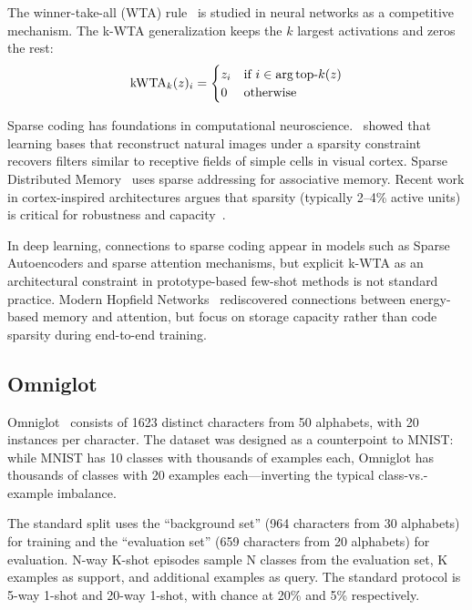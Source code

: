 \documentclass[11pt]{article}
\begin{document}
The winner-take-all (WTA) rule~\citep{maass2000computational} is studied in neural networks as a competitive mechanism. The k-WTA generalization keeps the $k$ largest activations and zeros the rest:
\begin{equation}
\text{kWTA}_k(z)_i = \begin{cases} z_i & \text{if } i \in \text{arg\,top-}k(z) \\ 0 & \text{otherwise} \end{cases}
\end{equation}

Sparse coding has foundations in computational neuroscience.~\citet{olshausen1996emergence} showed that learning bases that reconstruct natural images under a sparsity constraint recovers filters similar to receptive fields of simple cells in visual cortex. Sparse Distributed Memory~\citep{kanerva1988sparse} uses sparse addressing for associative memory. Recent work in cortex-inspired architectures argues that sparsity (typically 2--4\% active units) is critical for robustness and capacity~\citep{ahmad2019dense}.

In deep learning, connections to sparse coding appear in models such as Sparse Autoencoders and sparse attention mechanisms, but explicit k-WTA as an architectural constraint in prototype-based few-shot methods is not standard practice. Modern Hopfield Networks~\citep{ramsauer2021hopfield} rediscovered connections between energy-based memory and attention, but focus on storage capacity rather than code sparsity during end-to-end training.

\subsection{Omniglot}

Omniglot~\citep{lake2015human} consists of 1623 distinct characters from 50 alphabets, with 20 instances per character. The dataset was designed as a counterpoint to MNIST: while MNIST has 10 classes with thousands of examples each, Omniglot has thousands of classes with 20 examples each---inverting the typical class-vs.-example imbalance.

The standard split uses the ``background set'' (964 characters from 30 alphabets) for training and the ``evaluation set'' (659 characters from 20 alphabets) for evaluation. N-way K-shot episodes sample N classes from the evaluation set, K examples as support, and additional examples as query. The standard protocol is 5-way 1-shot and 20-way 1-shot, with chance at 20\% and 5\% respectively.
\end{document}
